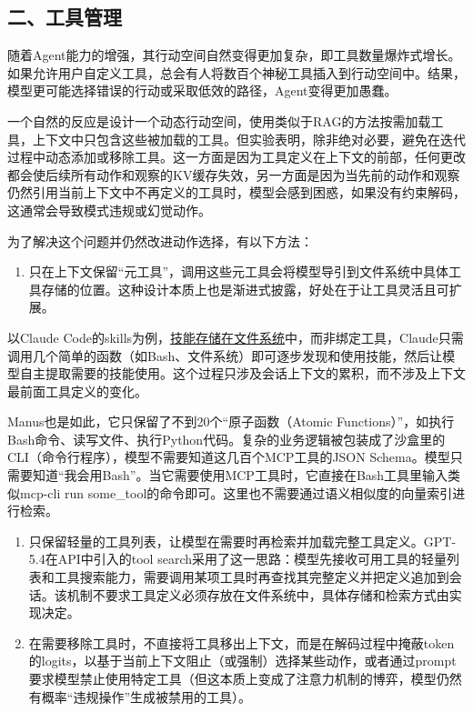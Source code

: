 \hypertarget{ux4e8cux5de5ux5177ux7ba1ux7406}{%
\subsection{二、工具管理}\label{ux4e8cux5de5ux5177ux7ba1ux7406}}

随着Agent能力的增强，其行动空间自然变得更加复杂，即工具数量爆炸式增长。如果允许用户自定义工具，总会有人将数百个神秘工具插入到行动空间中。结果，模型更可能选择错误的行动或采取低效的路径，Agent变得更加愚蠢。

一个自然的反应是设计一个动态行动空间，使用类似于RAG的方法按需加载工具，上下文中只包含这些被加载的工具。但实验表明，除非绝对必要，避免在迭代过程中动态添加或移除工具。这一方面是因为工具定义在上下文的前部，任何更改都会使后续所有动作和观察的KV缓存失效，另一方面是因为当先前的动作和观察仍然引用当前上下文中不再定义的工具时，模型会感到困惑，如果没有约束解码，这通常会导致模式违规或幻觉动作。

为了解决这个问题并仍然改进动作选择，有以下方法：

\begin{enumerate}
\def\labelenumi{\arabic{enumi}.}
\tightlist
\item
  只在上下文保留``元工具''，调用这些元工具会将模型导引到文件系统中具体工具存储的位置。这种设计本质上也是渐进式披露，好处在于让工具灵活且可扩展。
\end{enumerate}

以Claude Code的skills为例，\href{https://simonwillison.net/2025/Oct/16/claude-skills/\#skills-depend-on-a-coding-environment}{技能存储在文件系统}中，而非绑定工具，Claude只需调用几个简单的函数（如Bash、文件系统）即可逐步发现和使用技能，然后让模型自主提取需要的技能使用。这个过程只涉及会话上下文的累积，而不涉及上下文最前面工具定义的变化。

Manus也是如此，它只保留了不到20个``原子函数（Atomic Functions）''，如执行Bash命令、读写文件、执行Python代码。复杂的业务逻辑被包装成了沙盒里的CLI（命令行程序），模型不需要知道这几百个MCP工具的JSON Schema。模型只需要知道``我会用Bash''。当它需要使用MCP工具时，它直接在Bash工具里输入类似mcp-cli run some\_tool的命令即可。这里也不需要通过语义相似度的向量索引进行检索。

\begin{enumerate}
\def\labelenumi{\arabic{enumi}.}
\setcounter{enumi}{1}
\item
  只保留轻量的工具列表，让模型在需要时再检索并加载完整工具定义。GPT-5.4在API中引入的tool search采用了这一思路：模型先接收可用工具的轻量列表和工具搜索能力，需要调用某项工具时再查找其完整定义并把定义追加到会话。该机制不要求工具定义必须存放在文件系统中，具体存储和检索方式由实现决定。
\item
  在需要移除工具时，不直接将工具移出上下文，而是在解码过程中掩蔽token的logits，以基于当前上下文阻止（或强制）选择某些动作，或者通过prompt要求模型禁止使用特定工具（但这本质上变成了注意力机制的博弈，模型仍然有概率``违规操作''生成被禁用的工具）。
\end{enumerate}

